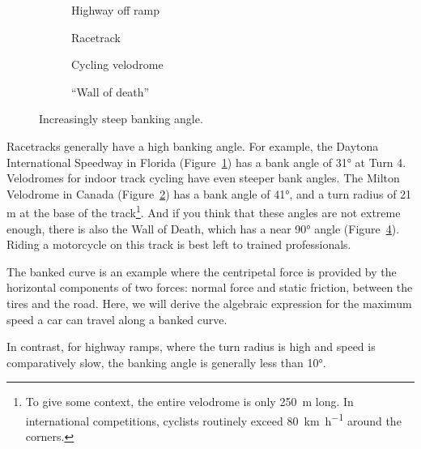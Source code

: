 \begin{figure}[ht]
  \centering
  \begin{subfigure}{.47\textwidth}
    \centering
    \caption{Highway off ramp}
  \end{subfigure}
  \begin{subfigure}{.47\textwidth}
    \centering
    \caption{Racetrack}
    \label{fig:daytona}
  \end{subfigure}
  
  \begin{subfigure}{.47\textwidth}
    \centering
    \caption{Cycling velodrome}
    \label{fig:milton-velodrome}
  \end{subfigure}
  \begin{subfigure}{.47\textwidth}
    \centering
    \caption{``Wall of death''}
    \label{fig:wall-of-death}
  \end{subfigure}
  \caption{Increasingly steep banking angle.}
\end{figure}

Racetracks generally have a high banking angle. For example, the Daytona
International Speedway in Florida (Figure~\ref{fig:daytona}) has a bank angle of
\ang{31} at Turn 4. Velodromes for indoor track cycling have even steeper bank
angles. The Milton Velodrome in Canada (Figure~\ref{fig:milton-velodrome}) has a
bank angle of \ang{41}, and a turn radius of 21 m at the base of the
track\footnote{To give some context, the entire velodrome is only
\SI{250}{\metre} long. In international competitions,
cyclists routinely exceed \SI{80}{\kilo\metre\per\hour} around the corners.}.
And if you think that these angles are not extreme enough, there is also the
Wall of Death, which has a near \ang{90} angle (Figure~\ref{fig:wall-of-death}).
Riding a motorcycle on this track is best left to trained professionals.

The banked curve is an example where the centripetal force is provided by the
horizontal components of two forces: normal force and static friction, between
the tires and the road. Here, we will derive the algebraic expression for the
maximum speed a car can travel along a banked curve.

In contrast, for highway ramps, where the turn radius is high and speed is
comparatively slow, the banking angle is generally less than \ang{10}.


